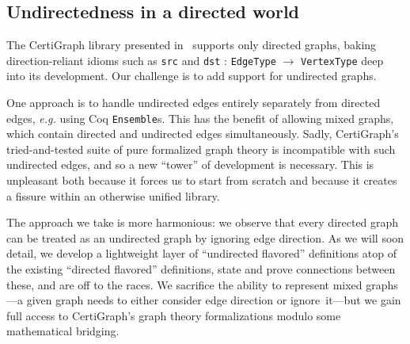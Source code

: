 
\subsection{Undirectedness in a directed world}

The CertiGraph library presented in~\cite{DBLP:journals/pacmpl/WangCMH19} 
supports only directed graphs, baking direction-reliant 
idioms 
such as 
\texttt{src} and \texttt{dst} : \texttt{EdgeType} $\rightarrow$ \texttt{VertexType}
deep into its development.
Our challenge is to add support for undirected graphs. 

One approach is to handle undirected edges entirely separately 
from directed edges, \emph{e.g.} using Coq \texttt{Ensemble}s. 
This has the benefit of allowing 
mixed graphs, which contain directed and undirected edges simultaneously. 
Sadly, CertiGraph's tried-and-tested suite of pure formalized graph theory is
incompatible with such undirected edges, and so a new 
``tower'' of development is necessary. 
This is unpleasant both because it forces us to start
from scratch and because it creates 
a
fissure 
within an otherwise unified library. 

The approach we take is more harmonious: 
we observe that every directed graph can be treated as an undirected 
graph by ignoring edge direction.
As we will soon detail, we develop a lightweight layer of 
``undirected flavored'' definitions atop of the existing 
``directed flavored'' definitions, state and prove connections 
between these, and are off to the races. 
We sacrifice the ability to represent mixed graphs---a given
graph needs to either consider edge direction or ignore~it---but 
we gain full access to CertiGraph's graph theory formalizations 
modulo some mathematical bridging.


